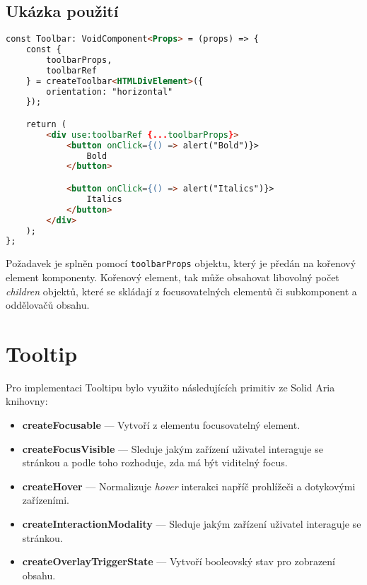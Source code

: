 \subsection{Ukázka použití}

\begin{lstlisting}[caption={Ukázka použití createToolbar funkce}, label={toolbar-example}, language=html]
const Toolbar: VoidComponent<Props> = (props) => {
    const {
        toolbarProps,
        toolbarRef
    } = createToolbar<HTMLDivElement>({
        orientation: "horizontal"
    });

    return (
        <div use:toolbarRef {...toolbarProps}>
            <button onClick={() => alert("Bold")}>
                Bold
            </button>

            <button onClick={() => alert("Italics")}>
                Italics
            </button>
        </div>
    );
};
\end{lstlisting}

Požadavek \hyperref[tfr11]{} je splněn pomocí \texttt{toolbarProps} objektu, který je předán na kořenový element komponenty.
Kořenový element, tak může obsahovat libovolný počet \textit{children} objektů, které se skládají z focusovatelných elementů či subkomponent a oddělovačů obsahu.

\section{Tooltip}

Pro implementaci Tooltipu bylo využito následujících primitiv ze Solid Aria knihovny:

\begin{itemize}
    \item \textbf{createFocusable} --- Vytvoří z elementu focusovatelný element.
    \item \textbf{createFocusVisible} --- Sleduje jakým zařízení uživatel interaguje se stránkou a podle toho rozhoduje, zda má být viditelný focus.
    \item \textbf{createHover} --- Normalizuje \textit{hover} interakci napříč prohlížeči a dotykovými zařízeními.
    \item \textbf{createInteractionModality} --- Sleduje jakým zařízení uživatel interaguje se stránkou.
    \item \textbf{createOverlayTriggerState} --- Vytvoří booleovský stav pro zobrazení obsahu.
\end{itemize}


